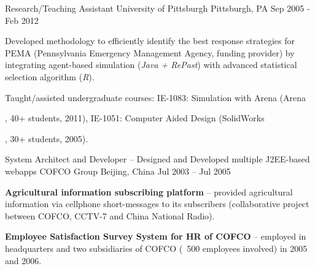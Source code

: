 \begin{cventries}
\cventry
{Research/Teaching Assistant}          %
{University of Pittsburgh}             %
{Pittsburgh, PA}                       %
{Sep 2005 - Feb 2012}                  %
{
    \begin{cvitems}                          
        \item {
Developed methodology to efficiently identify the best response strategies for PEMA (Pennsylvania Emergency Management Agency, funding provider) by integrating agent-based simulation (\textit{Java + RePast}) with advanced statistical selection algorithm (\textit{R}).
		}
        \item {
Taught/assisted undergraduate courses: IE-1083: Simulation with Arena (Arena\markright, 40+ students, 2011), IE-1051: Computer Aided Design (SolidWorks\markright, 30+ students, 2005).
		}        
    \end{cvitems}%
}

\cventry
{System Architect and Developer \tiny{-- Designed and Developed multiple J2EE-based webapps}}                   %
{COFCO Group}                         %
{Beijing, China}                      %
{Jul 2003 -- Jul 2005}                %
{
    \begin{cvitems}                          
        \item {
\textbf{Agricultural information subscribing platform} -- provided agricultural information via cellphone short-messages to its subscribers (collaborative project between COFCO, CCTV-7 and China National Radio).
		}          
        \item {
\textbf{Employee Satisfaction Survey System for HR of COFCO} -- employed in headquarters and two subsidiaries of COFCO (~500 employees involved) in 2005 and 2006. %
		}        
    \end{cvitems}  %
}
\end{cventries}
